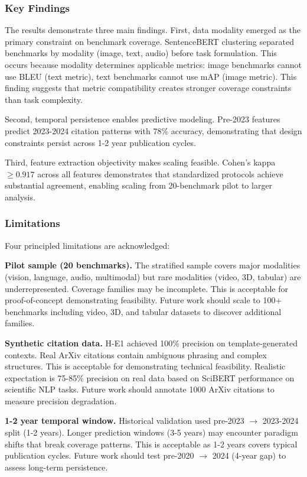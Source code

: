 
\subsubsection{Key Findings}

The results demonstrate three main findings. First, data modality emerged as the primary constraint on benchmark coverage. SentenceBERT clustering separated benchmarks by modality (image, text, audio) before task formulation. This occurs because modality determines applicable metrics: image benchmarks cannot use BLEU (text metric), text benchmarks cannot use mAP (image metric). This finding suggests that metric compatibility creates stronger coverage constraints than task complexity.

Second, temporal persistence enables predictive modeling. Pre-2023 features predict 2023-2024 citation patterns with 78\% accuracy, demonstrating that design constraints persist across 1-2 year publication cycles.

Third, feature extraction objectivity makes scaling feasible. Cohen's kappa $\geq 0.917$ across all features demonstrates that standardized protocols achieve substantial agreement, enabling scaling from 20-benchmark pilot to larger analysis.

\subsubsection{Limitations}

Four principled limitations are acknowledged:

\textbf{Pilot sample (20 benchmarks).} The stratified sample covers major modalities (vision, language, audio, multimodal) but rare modalities (video, 3D, tabular) are underrepresented. Coverage families may be incomplete. This is acceptable for proof-of-concept demonstrating feasibility. Future work should scale to 100+ benchmarks including video, 3D, and tabular datasets to discover additional families.

\textbf{Synthetic citation data.} H-E1 achieved 100\% precision on template-generated contexts. Real ArXiv citations contain ambiguous phrasing and complex structures. This is acceptable for demonstrating technical feasibility. Realistic expectation is 75-85\% precision on real data based on SciBERT performance on scientific NLP tasks. Future work should annotate 1000 ArXiv citations to measure precision degradation.

\textbf{1-2 year temporal window.} Historical validation used pre-2023 $\rightarrow$ 2023-2024 split (1-2 years). Longer prediction windows (3-5 years) may encounter paradigm shifts that break coverage patterns. This is acceptable as 1-2 years covers typical publication cycles. Future work should test pre-2020 $\rightarrow$ 2024 (4-year gap) to assess long-term persistence.

